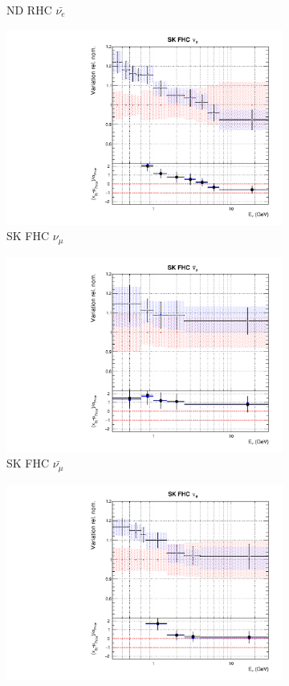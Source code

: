 \begin{figure}
\begin{subfigure}{0.24\textwidth}
  \caption{ND RHC $\bar{\nu_e}$}
\end{subfigure}
\begin{subfigure}{0.24\textwidth}
  \centering
  \includegraphics[width=0.95\linewidth]{figs/fixed2p2hflux8}
  \caption{SK FHC $\nu_{\mu}$}
\end{subfigure}
\begin{subfigure}{0.24\textwidth}
  \centering
  \includegraphics[width=0.95\linewidth]{figs/fixed2p2hflux9}
  \caption{SK FHC $\bar{\nu_{\mu}}$}
\end{subfigure}
\begin{subfigure}{0.24\textwidth}
  \centering
  \includegraphics[width=0.95\linewidth]{figs/fixed2p2hflux10}

\end{subfigure}
\end{figure}
